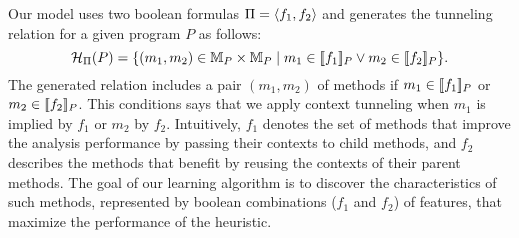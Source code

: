 Our model uses two boolean formulas $\Pi = \langle f_1,f_2
\rangle$ and generates the tunneling relation for a given program $P$ as follows:
\begin{equation}\label{eq:heuristic}
\mathcal{H}_{\Pi} (P) = \{ (m_1,m_2) \in {\mathbb{M}}_P \times
  {\mathbb{M}}_P \mid
  m_1 \in [\![f_1]\!]_P \vee m_2 \in [\![f_2]\!]_P \}.
\end{equation}
The generated relation includes a pair $(m_1, m_2)$ of methods if
$m_1 \in [\![f_1]\!]_P$ or $m_2 \in [\![f_2]\!]_P$.
This conditions says that we apply context tunneling when
$m_1$ is implied by $f_1$ or $m_2$ by $f_2$. Intuitively, $f_1$ denotes the set of methods that improve the
analysis performance by passing their contexts to child methods, and
$f_2$ describes the methods that benefit by reusing the contexts of
their parent methods. The goal of our learning algorithm is to
discover the characteristics of such methods, represented by boolean
combinations ($f_1$ and $f_2$) of features, that maximize the performance of
the heuristic.


